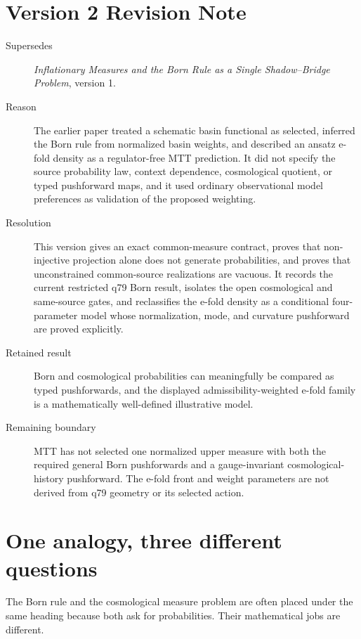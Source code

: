 \documentclass[11pt]{article}
\begin{document}
\section*{Version 2 Revision Note}
\begin{description}
\item[Supersedes] \emph{Inflationary Measures and the Born Rule as a Single
Shadow--Bridge Problem}, version 1.
\item[Reason] The earlier paper treated a schematic basin functional as
selected, inferred the Born rule from normalized basin weights, and described
an ansatz e-fold density as a regulator-free MTT prediction. It did not specify
the source probability law, context dependence, cosmological quotient, or
typed pushforward maps, and it used ordinary observational model preferences as
validation of the proposed weighting.
\item[Resolution] This version gives an exact common-measure contract, proves
that non-injective projection alone does not generate probabilities, and proves
that unconstrained common-source realizations are vacuous. It records the
current restricted q79 Born result, isolates the open cosmological and
same-source gates, and reclassifies the e-fold density as a conditional
four-parameter model whose normalization, mode, and curvature pushforward are
proved explicitly.
\item[Retained result] Born and cosmological probabilities can meaningfully be
compared as typed pushforwards, and the displayed admissibility-weighted
e-fold family is a mathematically well-defined illustrative model.
\item[Remaining boundary] MTT has not selected one normalized upper measure
with both the required general Born pushforwards and a gauge-invariant
cosmological-history pushforward. The e-fold front and weight parameters are
not derived from q79 geometry or its selected action.
\end{description}

\tableofcontents

\section{One analogy, three different questions}

The Born rule and the cosmological measure problem are often placed under the
same heading because both ask for probabilities. Their mathematical jobs are
different.
\end{document}
